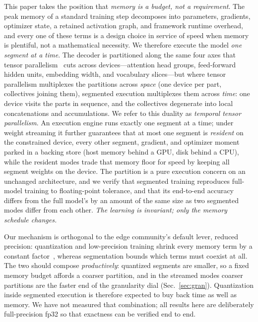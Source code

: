\documentclass[journal]{IEEEtran}
\begin{document}
This paper takes the position that \emph{memory is a budget, not a
requirement}. The peak memory of a standard training step decomposes into
parameters, gradients, optimizer state, a retained activation graph, and
framework runtime overhead, and every one of these terms is a design choice in
service of speed when memory is plentiful, not a mathematical necessity. We
therefore execute the model \emph{one segment at a time}. The decoder is
partitioned along the same four axes that tensor
parallelism~\cite{shoeybi2019megatron} cuts across devices---attention head
groups, feed-forward hidden units, embedding width, and vocabulary
slices---but where tensor parallelism multiplexes the partitions across
\emph{space} (one device per part, collectives joining them), segmented
execution multiplexes them across \emph{time}: one device visits the parts in
sequence, and the collectives degenerate into local concatenations and
accumulations. We refer to this duality as \emph{temporal tensor parallelism}.
An execution engine runs exactly one segment at a time; under weight
streaming it further guarantees that at most one segment is \emph{resident}
on the constrained device, every other segment, gradient, and optimizer
moment parked in a backing store (host memory behind a GPU, disk behind a
CPU), while the resident modes trade that memory floor for speed by keeping
all segment weights on the device. The
partition is a pure execution concern on an unchanged architecture, and we
verify that segmented training reproduces full-model training to
floating-point tolerance, and that its end-to-end accuracy differs from
the full model's by an amount of the same size as two segmented modes
differ from each other. \emph{The
learning is invariant; only the memory schedule changes.}

Our mechanism is orthogonal to the edge community's default lever, reduced
precision: quantization and low-precision training shrink every memory
term by a constant factor~\cite{nadalini2023reduced,micikevicius2018mixed},
whereas segmentation bounds which terms must coexist at all. The two
should compose \emph{productively}: quantized segments are smaller, so a
fixed memory budget affords a coarser partition, and in the streamed modes
coarser partitions are the faster end of the granularity dial
(Sec.~\ref{sec:gran}). Quantization
inside segmented execution is therefore expected to buy back time as well
as memory. We have not measured that combination; all results here
are deliberately full-precision fp32 so that exactness can be verified end
to end.
\end{document}
